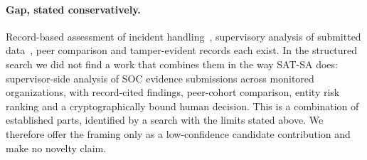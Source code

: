 \paragraph{Gap, stated conservatively.}
Record-based assessment of incident handling~\cite{palma2024compliance}, supervisory
analysis of submitted data~\cite{broeders2018suptech}, peer comparison and
tamper-evident records each exist. In the structured search we did not find a work
that combines them in the way SAT-SA does: supervisor-side analysis of SOC evidence
submissions across monitored organizations, with record-cited findings, peer-cohort
comparison, entity risk ranking and a cryptographically bound human decision. This
is a combination of established parts, identified by a search with the limits
stated above. We therefore offer the framing only as a low-confidence candidate
contribution and make no novelty claim.
